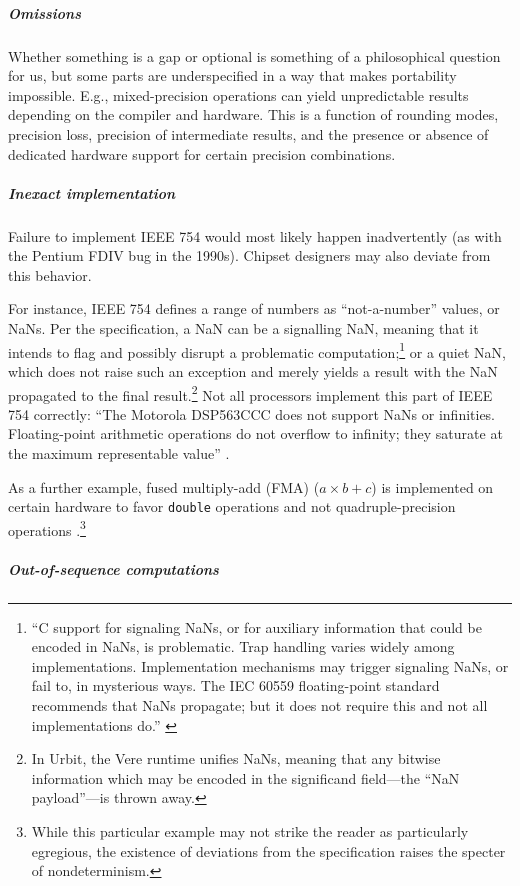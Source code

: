 \documentclass[twoside]{article}
\begin{document}
\subparagraph{Omissions}

Whether something is a gap or optional is something of a philosophical question for us, but some parts are underspecified in a way that makes portability impossible.  E.g., mixed-precision operations can yield unpredictable results depending on the compiler and hardware.  This is a function of rounding modes, precision loss, precision of intermediate results, and the presence or absence of dedicated hardware support for certain precision combinations.

\subparagraph{Inexact implementation}

Failure to implement IEEE 754 would most likely happen inadvertently (as with the Pentium FDIV bug in the 1990s).  Chipset designers may also deviate from this behavior.

For instance, IEEE 754 defines a range of numbers as “not-a-number” values, or NaNs.  Per the specification, a NaN can be a signalling NaN, meaning that it intends to flag and possibly disrupt a problematic computation;\footnote{“C support for signaling NaNs, or for auxiliary information that could be encoded in NaNs, is problematic.  Trap handling varies widely among implementations. Implementation mechanisms may trigger signaling NaNs, or fail to, in mysterious ways.  The IEC 60559 floating-point standard recommends that NaNs propagate; but it does not require this and not all implementations do.”  \citep[p.~339]{Jones2008}} or a quiet NaN, which does not raise such an exception and merely yields a result with the NaN propagated to the final result.\footnote{In Urbit, the Vere runtime unifies NaNs, meaning that any bitwise information which may be encoded in the significand field—the “NaN payload”—is thrown away.}  Not all processors implement this part of IEEE 754 correctly:  “The Motorola DSP563CCC does not support NaNs or infinities.  Floating-point arithmetic operations do not overflow to infinity; they saturate at the maximum representable value” \citep[p.~338]{Jones2008}.

As a further example, fused multiply-add (FMA) ($a \times b + c$) is implemented on certain hardware to favor \texttt{double} operations and not quadruple-precision operations \citep[p.~5]{Kahan1997}.\footnote{While this particular example may not strike the reader as particularly egregious, the existence of deviations from the specification raises the specter of nondeterminism.}

\subparagraph{Out-of-sequence computations}
\end{document}
